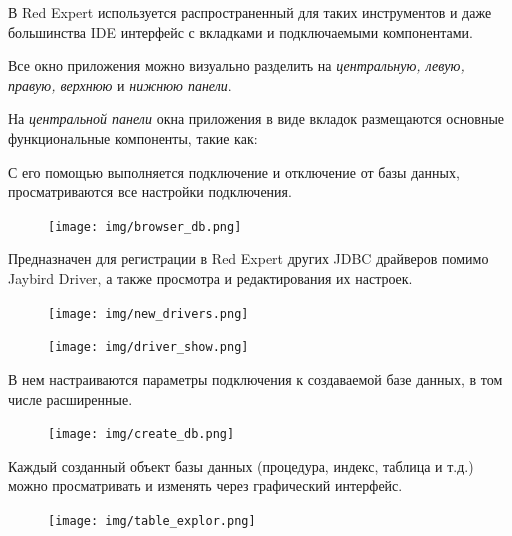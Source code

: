 В Red Expert используется распространенный для таких инструментов и даже большинства IDE интерфейс с вкладками и подключаемыми компонентами.

Все окно приложения можно визуально разделить на  \textit{центральную, левую, правую, верхнюю} и  \textit{нижнюю панели}.

На \textit{центральной панели} окна приложения в виде вкладок размещаются основные функциональные компоненты, такие как:


С его помощью выполняется подключение и отключение от базы данных, просматриваются все настройки подключения.
	\begin{figure}[H]
		\centering
		\texttt{[image: img/browser\_db.png]}
	\end{figure}

Предназначен для регистрации в Red Expert других JDBC драйверов помимо Jaybird Driver, а также просмотра и редактирования их настроек.
	\begin{figure}[H]
		\centering
		\texttt{[image: img/new\_drivers.png]}
	\end{figure}
	\begin{figure}[H]
		\centering
		\texttt{[image: img/driver\_show.png]}
	\end{figure}


В нем настраиваются параметры подключения к создаваемой базе данных, в том числе расширенные.
\begin{figure}[H]
	\centering
	\texttt{[image: img/create\_db.png]}
\end{figure}


Каждый созданный объект базы данных (процедура, индекс, таблица и т.д.) можно просматривать и изменять через графический интерфейс.
	\begin{figure}[H]
		\centering
		\texttt{[image: img/table\_explor.png]}
	\end{figure}


